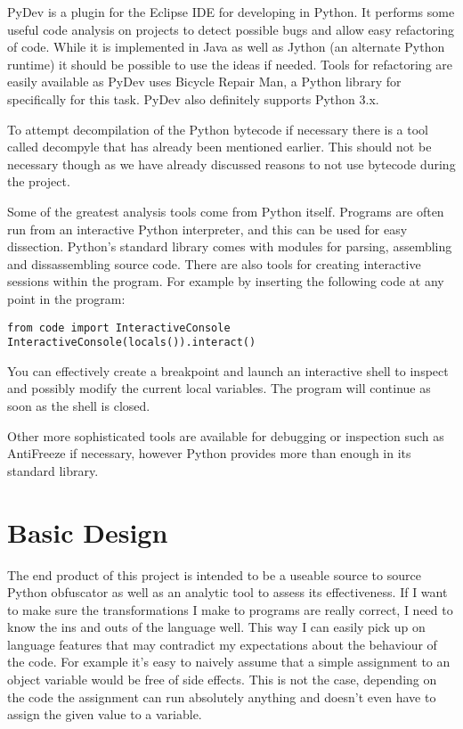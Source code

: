 \documentclass{report}
\begin{document}
PyDev\cite{pydev} is a plugin for the Eclipse IDE for developing in Python. It performs some useful code analysis on projects to detect
possible bugs and allow easy refactoring of code. While it is implemented in Java as well as Jython (an alternate Python runtime)
it should be possible to use the ideas if needed. Tools for refactoring are easily available as PyDev uses Bicycle Repair
Man\cite{bikerepair}, a Python library for specifically for this task. PyDev also definitely supports Python 3.x.

To attempt decompilation of the Python bytecode if necessary there is a tool called decompyle\cite{decompyle} that has already been
mentioned earlier. This should not be necessary though as we have already discussed reasons to not use bytecode during the project.

Some of the greatest analysis tools come from Python itself. Programs are often run from an interactive Python interpreter, and this
can be used for easy dissection. Python's standard library comes with modules for parsing, assembling and dissassembling source code.
There are also tools for creating interactive sessions within the program. For example by inserting the following code at any point
in the program:

\begin{lstlisting}
from code import InteractiveConsole
InteractiveConsole(locals()).interact()
\end{lstlisting}

You can effectively create a breakpoint and launch an interactive shell to inspect and possibly modify the current local
variables. The program will continue as soon as the shell is closed.

Other more sophisticated tools are available for debugging or inspection such as AntiFreeze\cite{pirates} if necessary,
however Python provides more than enough in its standard library.

\section{Basic Design}

The end product of this project is intended to be a useable source to source Python obfuscator as well as an analytic tool
to assess its effectiveness. If I want to make sure the transformations I make to programs are really correct, I need to
know the ins and outs of the language well. This way I can easily pick up on language features that may contradict my
expectations about the behaviour of the code. For example it's easy to naively assume that a simple assignment to an object
variable would be free of side effects. This is not the case, depending on the code the assignment can run absolutely
anything\cite{pyprop} and doesn't even have to assign the given value to a variable.
\end{document}
